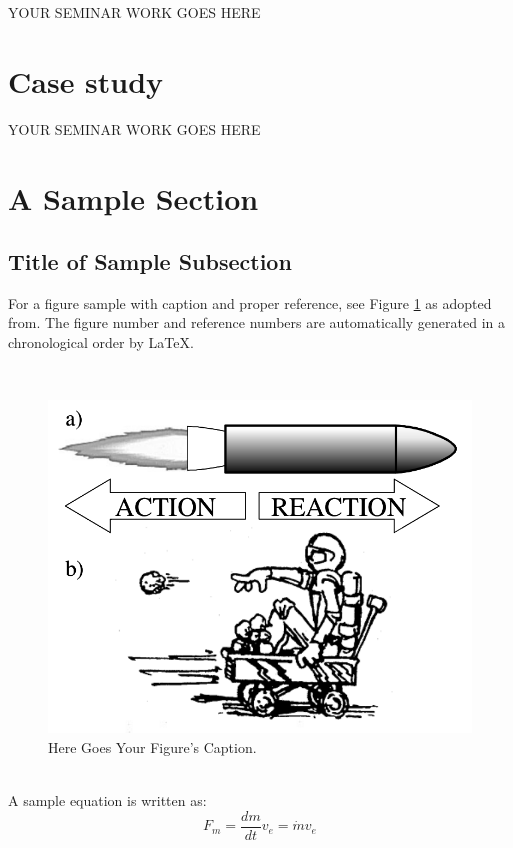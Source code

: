 \documentclass[12pt, a4paper]{article}
\begin{document}
YOUR SEMINAR WORK GOES HERE

\newpage
\section{Case study}
YOUR SEMINAR WORK GOES HERE

\newpage
\section{A Sample Section}

\subsection{Title of Sample Subsection}
For a figure sample with caption and proper reference, see Figure \ref{fig:some_cartoon} as adopted from\cite{paperauthor1}. The figure number and reference numbers are automatically generated in a chronological order by \LaTeX.

\\
 \begin{figure}[htbp]
\begin{center}
\includegraphics[scale=0.2]{cartoon.png}
\caption{Here Goes Your Figure's Caption.}
\label{fig:some_cartoon}
\end{center}
\end{figure}         
\\

A sample equation is written as:
\begin{equation} 
F_m=\frac{dm}{dt}v_e =  \dot{m}v_e 
\end{equation}
\end{document}
